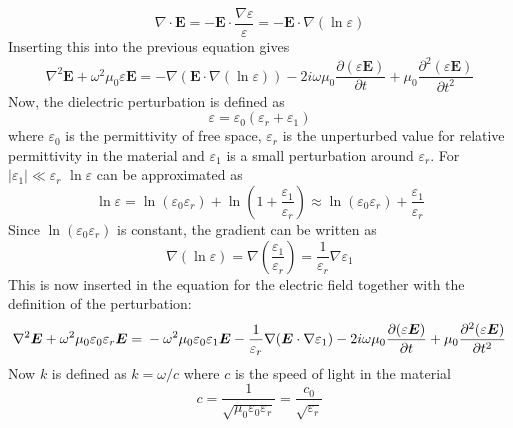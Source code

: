 \documentclass[10pt,a4paper,draft]{scrartcl}
\begin{document}
	\begin{equation*}
		\nabla \cdot \bm{E} = -\bm{E} \cdot \frac{\nabla \varepsilon}{\varepsilon} = -\bm{E} \cdot \nabla (\ln{\varepsilon})
	\end{equation*}
	Inserting this into the previous equation gives
	\begin{equation*}
		\nabla^2\bm{E} + \omega^2 \mu_0 \varepsilon \bm{E} = -\nabla(\bm{E} \cdot \nabla (\ln{\varepsilon})) - 2i\omega \mu_0 \frac{\partial (\varepsilon \bm{E})}{\partial t} + \mu_0 \frac{\partial^2 (\varepsilon \bm{E})}{\partial t^2}
	\end{equation*}
	Now, the dielectric perturbation is defined as
	\begin{equation*}
	\varepsilon = \varepsilon_0(\varepsilon_r + \varepsilon_1)
	\end{equation*}
	where $\varepsilon_0$ is the permittivity of free space, $\varepsilon_r$ is the unperturbed value for relative permittivity in the material and $\varepsilon_1$ is a small perturbation around $\varepsilon_r$. For $|\varepsilon_1| \ll \varepsilon_r$ $\ln{\varepsilon}$ can be approximated as
	\begin{equation*}
		\ln{\varepsilon} = \ln(\varepsilon_0 \varepsilon_r) + \ln(1 + \frac{\varepsilon_1}{\varepsilon_r}) \approx \ln(\varepsilon_0 \varepsilon_r) + \frac{\varepsilon_1}{\varepsilon_r}
	\end{equation*}
	Since $\ln(\varepsilon_0 \varepsilon_r)$ is constant, the gradient can be written as
	\begin{equation*}
		\nabla(\ln{\varepsilon}) = \nabla \left( \frac{\varepsilon_1}{\varepsilon_r} \right) = \frac{1}{\varepsilon_r} \nabla \varepsilon_1
	\end{equation*}
	This is now inserted in the equation for the electric field together with the definition of the perturbation:
	\begin{equation*}
		\nabla^2\bm{E} + \omega^2 \mu_0 \varepsilon_0 \varepsilon_r \bm{E} = \\
		 -\omega^2 \mu_0 \varepsilon_0 \varepsilon_1 \bm{E} -\frac{1}{\varepsilon_r}\nabla(\bm{E} \cdot \nabla \varepsilon_1) - 2i\omega \mu_0 \frac{\partial (\varepsilon \bm{E})}{\partial t} + \mu_0 \frac{\partial^2 (\varepsilon \bm{E})}{\partial t^2}
	\end{equation*}
	Now $k$ is defined as $k = \omega/c$ where $c$ is the speed of light in the material
	\begin{equation*}
		c = \frac{1}{\sqrt{\mu_0 \varepsilon_0 \varepsilon_r}} = \frac{c_0}{\sqrt{\varepsilon_r}}
	\end{equation*}
\end{document}

